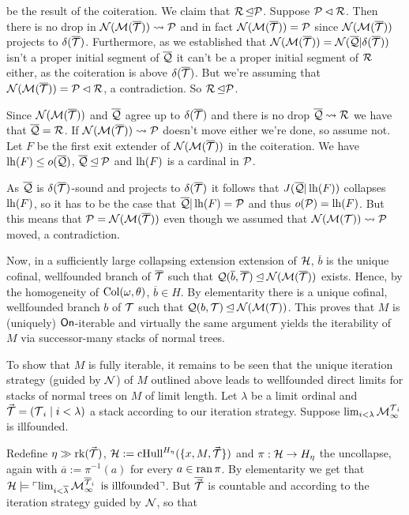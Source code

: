 \documentclass[../../main]{subfiles}
\begin{document}
{{    be the result of the coiteration. We claim that $\R\init\P$. Suppose $\P\pinit\R$. Then there is no drop in $\N(\M(\overline\T))\leadsto\P$ and in fact $\N(\M(\overline\T))=\P$ since $\N(\M(\overline\T))$ projects to $\delta(\overline\T)$. Furthermore, as we established that $\N(\M(\overline\T))=\N(\overline\Q|\delta(\overline\T))$ isn't a proper initial segment of $\overline\Q$ it can't be a proper initial segment of $\R$ either, as the coiteration is above $\delta(\overline\T)$. But we're assuming that $\N(\M(\overline\T))=\P\pinit\R$, a contradiction. So $\R\init\P$.
        
    \qquad Since $\N(\M(\overline\T))$ and $\overline\Q$ agree up to $\delta(\overline\T)$ and there is no drop $\overline\Q\leadsto\R$ we have that $\overline\Q=\R$. If $\N(\M(\overline\T))\leadsto\P$ doesn't move either we're done, so assume not. Let $F$ be the first exit extender  of $\N(\M(\overline\T))$ in the coiteration. We have $\lh(F) \le o(\overline\Q)$, $\overline\Q\init\P$ and $\lh(F)$ is a cardinal in $\P$.
        
    \qquad As $\overline\Q$ is $\delta(\overline\T)$-sound and projects to $\delta(\overline\T)$ it follows that $J(\overline\Q|\lh(F))$ collapses $\lh(F)$, so it has to be the case that $\overline\Q|\lh(F)=\P$ and thus $o(\P)=\lh(F)$. But this means that $\P=\N(\M(\overline\T))$ even though we assumed that $\N(\M(\T))\leadsto\P$ moved, a contradiction.
  }

  Now, in a sufficiently large collapsing extension extension of $\h$, $\overline b$ is the unique cofinal, wellfounded branch of $\overline\T$ such that $\Q(\overline b,\overline\T) \init\N(\M(\overline\T))$ exists. Hence, by the homogeneity of $\col(\omega,\theta)$, $\overline b \in H$. By elementarity there is a unique cofinal, wellfounded branch $b$ of $\T$ such that $\Q(b,\T)\init\N(\M(\T))$. This proves that $M$ is (uniquely) $\on$-iterable and virtually the same argument yields the iterability of $M$ via successor-many stacks of normal trees.
  
  \qquad To show that $M$ is fully iterable, it remains to be seen that the unique iteration strategy (guided by $\N$) of $M$ outlined above leads to wellfounded direct limits for stacks of normal trees on $M$ of limit length. Let $\lambda$ be a limit ordinal and $\vec\T = (\T_i \mid i<\lambda)$ a stack according to our iteration strategy. Suppose $\lim_{i<\lambda}\M^{\T_i}_\infty$ is illfounded.
  
  \qquad Redefine $\eta\gg\rk(\vec\T)$, $\h:=\chull^{H_\eta}(\{x,M,\vec\T\})$ and $\pi:\h\to H_\eta$ the uncollapse, again with $\overline a:=\pi^{-1}(a)$ for every $a\in\ran\pi$. By elementarity we get that $\h\models\godel{\lim_{i<\overline\lambda}\M^{\overline\T_i}_\infty\text{ is illfounded}}$. But $\overline{\vec\T}$ is countable and according to the iteration strategy guided by $\N$, so that

}
\end{document}
